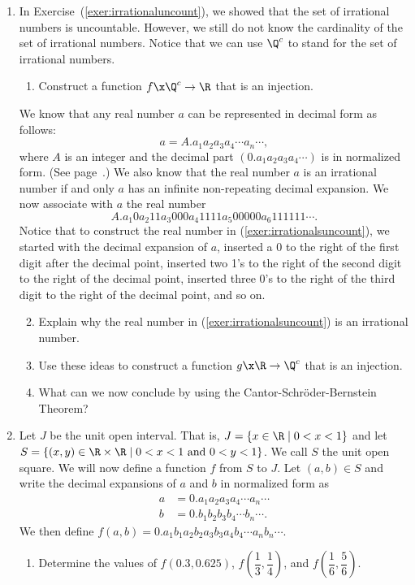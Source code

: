 \begin{enumerate}
\item In Exercise~(\ref{exer:irrationaluncount}), we showed that the set of irrational numbers is uncountable.  However, we still do not know the cardinality of the set of irrational numbers.  Notice that we can use $\Q^c$ to stand for the set of irrational numbers.

\begin{enumerate}
\item Construct a function $f\x \Q^c \to \R$ that is an injection.
\end{enumerate}
We know that any real number $a$ can be represented in decimal form as follows:
\[
a = A.a_1 a_2 a_3 a_4 \cdots a_n \cdots ,
\]
where $A$ is an integer and the decimal part $( 0.a_1 a_2 a_3 a_4 \cdots )$ is in normalized form.  (See page~\pageref{normalizedform}.)  We also know that the real number $a$ is an irrational number if and only $a$ has an infinite non-repeating decimal expansion.  We now associate with $a$ the real number
\setcounter{equation}{0}
\begin{equation}\label{exer:irrationalsuncount}
A.a_1 0 a_2 1 1 a_3 0 0 0 a_4 1 1 1 1 a_5 0 0 0 0 0 a_6 1 1 1 1 1 1 \cdots .
\end{equation}
Notice that to construct the real number in (\ref{exer:irrationalsuncount}), we started with the decimal expansion of $a$, inserted a 0 to the right of the first digit after the decimal point, inserted two 1's to the right of the second digit to the right of the decimal point, inserted three 0's to the right of the third digit to the right of the decimal point, and so on.

\begin{enumerate} \setcounter{enumii}{1}
\item Explain why the real number in (\ref{exer:irrationalsuncount}) is an irrational number.
\item Use these ideas to construct a function $g\x \R \to \Q^c$ that is an injection.
\item What can we now conclude by using the Cantor-Schr\"{o}der-Bernstein Theorem?
\end{enumerate}

\item Let $J$ be the unit open interval.  That is, $J = \left\{ x \in \R \mid 0 < x < 1 \right\}$ and let $S = \left\{ (x, y) \in \R \times \R \mid 0 < x < 1 \text{ and } 0 < y < 1 \right\}$.  We call $S$ the unit open square.  We will now define a function $f$ from $S$ to $J$.  Let 
$(a, b) \in S$ and write the decimal expansions of $a$ and $b$ in normalized form as
\begin{align*}
a &= 0.a_1 a_2 a_3 a_4 \cdots a_n \cdots \\
b &= 0.b_1 b_2 b_3 b_4 \cdots b_n \cdots .
\end{align*}
We then define $f(a, b) = 0.a_1 b_1 a_2 b_2 a_3 b_3 a_4 b_4 \cdots a_n b_n \cdots$.
\begin{enumerate}
\item Determine the values of $f ( 0.3, 0.625 )$, $f \!\left( \dfrac{1}{3}, \dfrac{1}{4} \right)$, and $f \!\left( \dfrac{1}{6}, \dfrac{5}{6} \right)$.


\end{enumerate}
\end{enumerate}
